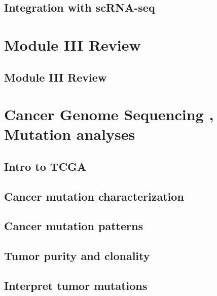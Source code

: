 \documentclass[
]{book}
\begin{document}
\hypertarget{integration-with-scrna-seq}{%
\section{Integration with scRNA-seq}\label{integration-with-scrna-seq}}

\hypertarget{m3re}{%
\chapter{Module III Review}\label{m3re}}

\hypertarget{module-iii-review}{%
\section{Module III Review}\label{module-iii-review}}

\hypertarget{cancerseq}{%
\chapter{Cancer Genome Sequencing , Mutation analyses}\label{cancerseq}}

\hypertarget{intro-to-tcga}{%
\section{Intro to TCGA}\label{intro-to-tcga}}

\hypertarget{cancer-mutation-characterization}{%
\section{Cancer mutation characterization}\label{cancer-mutation-characterization}}

\hypertarget{cancer-mutation-patterns}{%
\section{Cancer mutation patterns}\label{cancer-mutation-patterns}}

\hypertarget{tumor-purity-and-clonality}{%
\section{Tumor purity and clonality}\label{tumor-purity-and-clonality}}

\hypertarget{interpret-tumor-mutations}{%
\section{Interpret tumor mutations}\label{interpret-tumor-mutations}}
\end{document}
